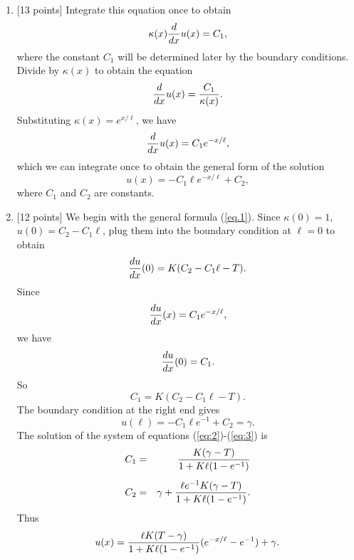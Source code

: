 \begin{solution}
\begin{enumerate}
\item {[13 points]} Integrate this equation once to
       obtain
          \[ \kappa(x) {d \over d x} u(x) = C_1,\]
       where the constant $C_1$ will be determined later by the
       boundary conditions.  Divide by $\kappa(x)$ to obtain the
       equation
          \[ {d \over d x} u(x) = {C_1\over \kappa(x)}.\]
       Substituting $\kappa(x) =  e^{x/\ell}$, we have
          \[ {d \over d x} u(x) = {C_1 e^{-x/\ell}},\]
       which we can integrate once to obtain the general form of the
       solution
       \begin{equation}\label{eq.1} u(x) = {-C_1\ell }  e^{-x/\ell}+ C_2,
       \end{equation}
       where $C_1$ and $C_2$ are constants.

\item {[}12 points{]} We begin with the general formula
      (\ref{eq.1}).  Since $\kappa(0)=1$, $u(0)=C_2-C_1\ell$, plug them into the 
        boundary condition at $\ell = 0$ to obtain
        \[ {d u \over dx}(0)=K(C_2-C_1\ell-T). \]
        Since
        \[ {d u \over d x}(x) = C_1 e^{-x/\ell},\]
        we have
        \[ {d u \over d x}(0) = C_1.\]
        So 
         \begin{equation} \label{eq:2} 
           C_1=K(C_2-C_1\ell-T). 
        \end{equation} 
        The boundary condition at the right end gives 
        \begin{equation} \label{eq:3} 
        u(\ell) = -C_1\ell e^{-1} + C_2=\gamma. \end{equation}
        The solution of the system of equations (\ref{eq:2})-(\ref{eq:3}) is 
        \begin{eqnarray*}
            C_1 &=& {K(\gamma-T)}\over{1+K\ell(1-e^{-1})} \\[0.5em]
            C_2 &=& \gamma + \frac{\ell e^{-1}K(\gamma-T)}{1+K\ell(1-e^{-1})}.
         \end{eqnarray*}
        Thus
        \[ u(x)={{\ell K(T-\gamma)}\over{1+K\ell(1-e^{-1})}}( e^{-x/\ell}-e^{-1})+
        \gamma. \]

\end{enumerate}
\end{solution}
